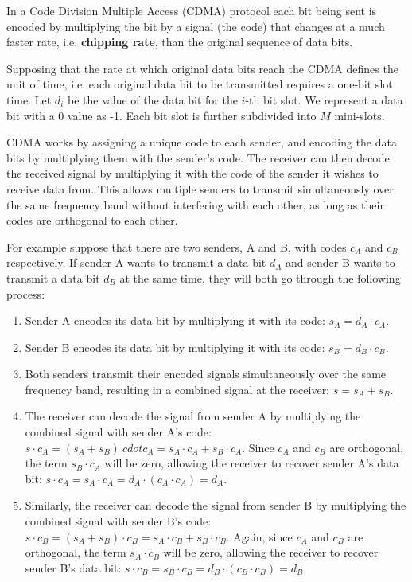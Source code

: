 \documentclass[12pt letter]{report}
\begin{document}

In a Code Division Multiple Access (CDMA) protocol each bit being
sent is encoded by multiplying the bit by a signal (the code) that
changes at a much faster rate, i.e. \textbf{chipping rate}, than the
original sequence of data bits.

Supposing that the rate at which original data bits reach the CDMA
defines the unit of time, i.e. each original data bit to be
transmitted requires a one-bit slot time. Let $d_i$ be the value of
the data bit for the $i$-th bit slot. We represent a data bit with a
0 value as -1. Each bit slot is further subdivided into $M$ mini-slots.

CDMA works by assigning a unique code to each sender, and encoding
the data bits by multiplying them with the sender's code. The
receiver can then decode the received signal by multiplying it with
the code of the sender it wishes to receive data from. This allows
multiple senders to transmit simultaneously over the same frequency
band without interfering with each other, as long as their codes are
orthogonal to each other.

For example suppose that there are two senders, A and B, with codes
$c_A$ and $c_B$ respectively. If sender A wants to transmit a data
bit $d_A$ and sender B wants to transmit a data bit $d_B$ at the same
time, they will both go through the following process:
\begin{enumerate}
  \item Sender A encodes its data bit by multiplying it with its
    code: $s_A = d_A \cdot c_A$.
  \item Sender B encodes its data bit by multiplying it with its
    code: $s_B = d_B \cdot c_B$.
  \item Both senders transmit their encoded signals simultaneously
    over the same frequency band, resulting in a combined signal at
    the receiver: $s = s_A + s_B$.
  \item The receiver can decode the signal from sender A by
    multiplying the combined signal with sender A's code: $s \cdot
    c_A = (s_A + s_B) \ cdot c_A = s_A \cdot c_A + s_B \cdot c_A$.
    Since $c_A$ and $c_B$ are orthogonal, the term $s_B \cdot c_A$
    will be zero, allowing the receiver to recover sender A's data
    bit: $s \cdot c_A = s_A \cdot c_A = d_A \cdot (c_A \cdot c_A) = d_A$.
  \item Similarly, the receiver can decode the signal from sender B by
    multiplying the combined signal with sender B's code: $s \cdot
    c_B = (s_A + s_B) \cdot c_B = s_A \cdot c_B + s_B \cdot c_B$.
    Again, since $c_A$ and $c_B$ are orthogonal, the term $s_A \cdot
    c_B$ will be zero, allowing the receiver to recover sender B's data
    bit: $s \cdot c_B = s_B \cdot c_B = d_B \cdot (c_B \cdot c_B) = d_B$.
\end{enumerate}
\end{document}
